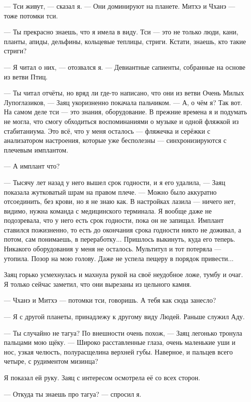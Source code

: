 --- Тси живут, --- сказал я.
--- Они доминируют на планете.
Митхэ и Чханэ --- тоже потомки тси.

--- Ты прекрасно знаешь, что я имела в виду.
Тси --- это не только люди, кани, планты, апиды, дельфины, кольцевые теплицы, стриги.
Кстати, знаешь, кто такие стриги?

--- Я читал о них, --- отозвался я.
--- Девиантные сапиенты, собранные на основе из ветви Птиц.

--- Ты читал отчёты, но вряд ли где-то написано, что они из ветви Очень Милых Лупоглазиков, --- Заяц укоризненно покачала пальчиком.
--- А, о чём я?
Так вот.
На самом деле тси --- это знания, оборудование.
В прежние времена я и подумать не могла, что смогу обходиться воспоминаниями о музыке и одной фляжкой из стабитаниума.
Это всё, что у меня осталось --- фляжечка и серёжки с анализатором настроения, которые уже бесполезны --- синхронизируются с плечевым имплантом.

--- А имплант что?

--- Тысячу лет назад у него вышел срок годности, и я его удалила, --- Заяц показала жутковатый шрам на правом плече.
--- Можно было аккуратно отсоединить, без крови, но я не знаю как.
В настройках лазила --- ничего нет, видимо, нужна команда с медицинского терминала.
Я вообще даже не подозревала, что у него есть срок годности, пока он не запищал.
Имплант ставился пожизненно, то есть до окончания срока годности никто не доживал, а потом, сам понимаешь, в переработку...
Пришлось выкинуть, куда его теперь.
Никакого оборудования у меня не осталось.
Мультитул и тот потеряла --- утопила.
Позор на мою голову.
Даже не успела пещеру в порядок привести...

Заяц горько усмехнулась и махнула рукой на своё неудобное ложе, тумбу и очаг.
Я только сейчас заметил, что они вырезаны из цельного камня.

--- Чханэ и Митхэ --- потомки тси, говоришь.
А тебя как сюда занесло?

--- Я с другой планеты, принадлежу к другому виду Людей.
Раньше служил Аду.

--- Ты случайно не тагуа?
По внешности очень похож, --- Заяц легонько тронула пальцами мою щёку.
--- Широко расставленные глаза, очень маленькие уши и нос, узкая челюсть, полурасщелина верхней губы.
Наверное, и пальцев всего четыре, с рудиментом мизинца?

Я показал ей руку.
Заяц с интересом осмотрела её со всех сторон.

--- Откуда ты знаешь про тагуа? --- спросил я.

